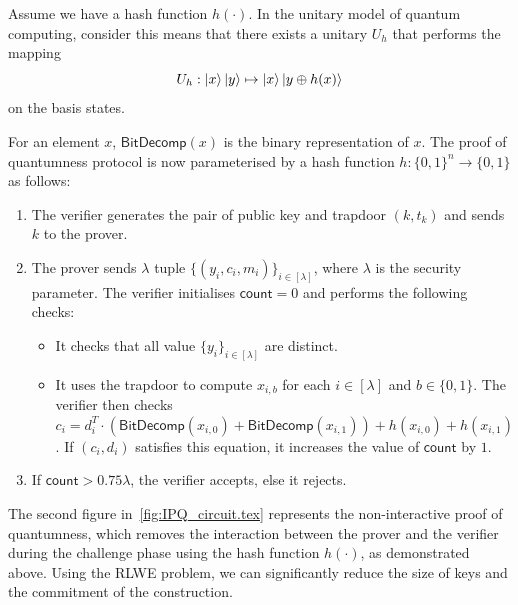 \documentclass[cryptography,review,submit,pdftex,moreauthors,amsmath,amssymb,aps,strict]{Definitions/mdpi}
\begin{document}
Assume we have a hash function $h(\cdot)$. In the unitary model of quantum computing, consider this means that there exists a unitary $U_h$ that performs the mapping 
$$U_h: \ket{x}\ket{y} \mapsto \ket{x}\ket{y\oplus h(x)}$$
on the basis states.

For an element $x$, $\mathsf{BitDecomp}(x)$ is the binary representation of $x$. The proof of quantumness protocol is now parameterised by a hash function $h:\{0,1\}^n\to\{0,1\}$ as follows:
\begin{enumerate}
    \item The verifier generates the pair of public key and trapdoor $(k,t_k)$ and sends $k$ to the prover.
    \item The prover sends $\lambda$ tuple $\{(y_i,c_i,m_i)\}_{i\in[\lambda]}$, where $\lambda$ is the security parameter. The verifier initialises $\mathsf{count}=0$ and performs the following checks:
    \begin{itemize}
        \item It checks that all value $\{y_i\}_{i\in[\lambda]}$ are distinct.
        \item It uses the trapdoor to compute $x_{i,b}$ for each $i\in[\lambda]$ and $b\in\{0,1\}$. The verifier then checks $c_i=d_i^T\cdot(\mathsf{BitDecomp}(x_{i,0})+\mathsf{BitDecomp}(x_{i,1}))+h(x_{i,0})+h(x_{i,1})$. If $(c_i,d_i)$ satisfies this equation, it increases the value of $\mathsf{count}$ by $1$.
    \end{itemize}
    \item If $\mathsf{count}>0.75\lambda$, the verifier accepts, else it rejects.
\end{enumerate}

The second figure in~\ref{fig:IPQ_circuit.tex} represents the non-interactive proof of quantumness, which removes the interaction between the prover and the verifier during the challenge phase using the hash function $h(\cdot)$, as demonstrated above. Using the RLWE problem, we can significantly reduce the size of keys and the commitment of the construction.  
\end{document}
